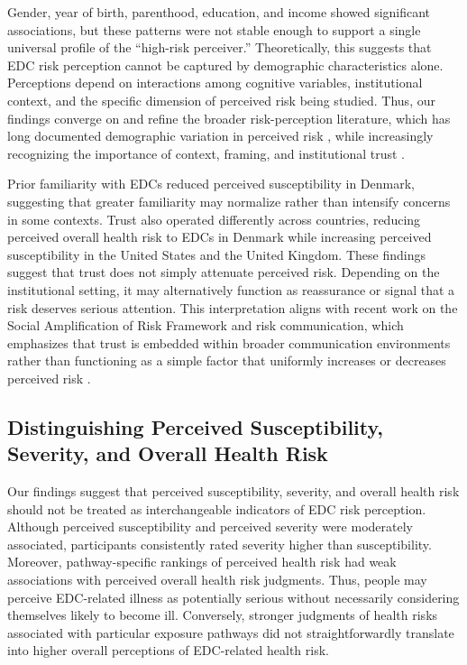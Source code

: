 Gender, year of birth, parenthood, education, and income showed significant associations, but these patterns were not stable enough to support a single universal profile of the “high-risk perceiver.” Theoretically, this suggests that EDC risk perception cannot be captured by demographic characteristics alone. Perceptions depend on interactions among cognitive variables, institutional context, and the specific dimension of perceived risk being studied. Thus, our findings converge on and refine the broader risk-perception literature, which has long documented demographic variation in perceived risk \citep{flynn1994gender, finucane2000affect}, while increasingly recognizing the importance of context, framing, and institutional trust \citep{siegrist2021trust, balog2020evolving}.

Prior familiarity with EDCs reduced perceived susceptibility in Denmark, suggesting that greater familiarity may normalize rather than intensify concerns in some contexts. Trust also operated differently across countries, reducing perceived overall health risk to EDCs in Denmark while increasing perceived susceptibility in the United States and the United Kingdom. These findings suggest that trust does not simply attenuate perceived risk. Depending on the institutional setting, it may alternatively function as reassurance or signal that a risk deserves serious attention. This interpretation aligns with recent work on the Social Amplification of Risk Framework and risk communication, which emphasizes that trust is embedded within broader communication environments rather than functioning as a simple factor that uniformly increases or decreases perceived risk \citep{bearth2022social, kasperson2022social}. 

\subsection{Distinguishing Perceived Susceptibility, Severity, and Overall Health Risk}
Our findings suggest that perceived susceptibility, severity, and overall health risk should not be treated as interchangeable indicators of EDC risk perception. Although perceived susceptibility and perceived severity were moderately associated, participants consistently rated severity higher than susceptibility. Moreover, pathway-specific rankings of perceived health risk had weak associations with perceived overall health risk judgments. Thus, people may perceive EDC-related illness as potentially serious without necessarily considering themselves likely to become ill. Conversely, stronger judgments of health risks associated with particular exposure pathways did not straightforwardly translate into higher overall perceptions of EDC-related health risk.

